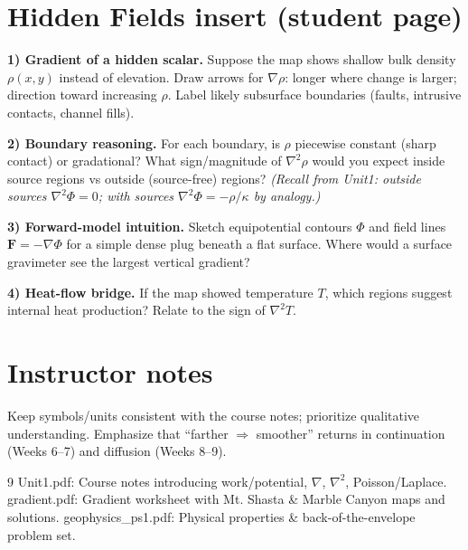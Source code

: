 \documentclass[11pt,a4paper]{article}
\begin{document}
\section*{Hidden Fields insert (student page)}
\textbf{1) Gradient of a hidden scalar.} Suppose the map shows shallow bulk density $\rho(x,y)$ instead of elevation. Draw arrows for $\nabla \rho$: longer where change is larger; direction toward increasing $\rho$. Label likely subsurface boundaries (faults, intrusive contacts, channel fills).

\textbf{2) Boundary reasoning.} For each boundary, is $\rho$ piecewise constant (sharp contact) or gradational? What sign/magnitude of $\nabla^2 \rho$ would you expect inside source regions vs outside (source-free) regions? \emph{(Recall from Unit1: outside sources $\nabla^2\Phi=0$; with sources $\nabla^2\Phi=-\rho/\kappa$ by analogy.)} \cite{unit1}

\textbf{3) Forward-model intuition.} Sketch equipotential contours $\Phi$ and field lines $\mathbf{F}=-\nabla\Phi$ for a simple dense plug beneath a flat surface. Where would a surface gravimeter see the largest vertical gradient?

\textbf{4) Heat-flow bridge.} If the map showed temperature $T$, which regions suggest internal heat production? Relate to the sign of $\nabla^2 T$.

\section*{Instructor notes}
Keep symbols/units consistent with the course notes; prioritize qualitative understanding. Emphasize that “farther $\Rightarrow$ smoother” returns in continuation (Weeks 6--7) and diffusion (Weeks 8--9). \cite{unit1}

\begin{thebibliography}{9}
 Unit1.pdf: Course notes introducing work/potential, $\nabla$, $\nabla^2$, Poisson/Laplace. \cite{turn8search3}
 gradient.pdf: Gradient worksheet with Mt. Shasta \& Marble Canyon maps and solutions. \cite{turn9search2}
 geophysics\_ps1.pdf: Physical properties \& back-of-the-envelope problem set. \cite{turn8search2}
\end{thebibliography}
\end{document}
